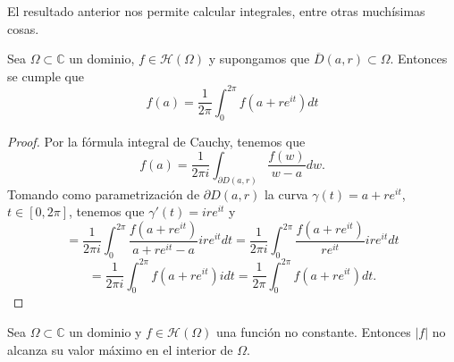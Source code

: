 El resultado anterior nos permite calcular integrales, entre otras muchísimas cosas.


\begin{teorema} 
    Sea $\Omega \subset \mathbb{C}$ un dominio, $f \in \mathcal{H}(\Omega)$ y supongamos que $\overline{D}(a, r) \subset \Omega$. Entonces se cumple que
    \[
        f(a) = \frac{1}{2 \pi} \int_{0}^{2 \pi} f(a + r e^{i t}) dt
    \] 
\end{teorema}

\begin{proof}
    Por la fórmula integral de Cauchy, tenemos que
    \[
        f(a) = \frac{1}{2 \pi i} \int_{\partial D(a, r)} \frac{f(w)}{w - a} dw.
    \]
    Tomando como parametrización de $\partial D(a, r)$ la curva $\gamma(t) = a + r e^{i t}$, $t \in [0, 2 \pi]$, tenemos que $\gamma'(t) = i r e^{i t}$ y
    \[
        = \frac{1}{2 \pi i} \int_{0}^{2 \pi} \frac{f(a + r e^{i t})}{a + r e^{i t} - a} i r e^{i t} dt = \frac{1}{2 \pi i} \int_{0}^{2 \pi} \frac{f(a + r e^{i t})}{r e^{i t}} i r e^{i t} dt
    \]
    \[
        = \frac{1}{2 \pi i} \int_{0}^{2 \pi} f(a + r e^{i t}) i dt = \frac{1}{2 \pi} \int_{0}^{2 \pi} f(a + r e^{i t}) dt.
    \]
\end{proof}

\begin{corolario}
    Sea $\Omega \subset \mathbb{C}$ un dominio y $f \in \mathcal{H}(\Omega)$ una función no constante. 
    Entonces $|f|$ no alcanza su valor máximo en el interior de $\Omega$.
\end{corolario}

